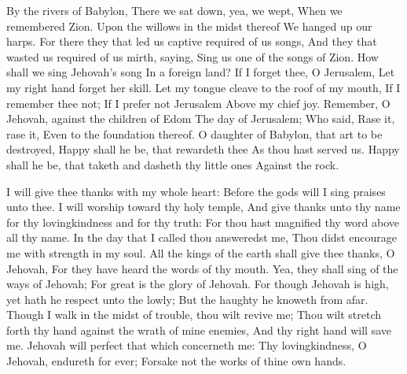 By the rivers of Babylon, There we sat down, yea, we wept, When we remembered Zion.  Upon the willows in the midst thereof We hanged up our harps.  For there they that led us captive required of us songs, And they that wasted us required of us mirth, saying, Sing us one of the songs of Zion.  How shall we sing Jehovah’s song In a foreign land?  If I forget thee, O Jerusalem, Let my right hand forget her skill.  Let my tongue cleave to the roof of my mouth, If I remember thee not; If I prefer not Jerusalem Above my chief joy.  Remember, O Jehovah, against the children of Edom The day of Jerusalem; Who said, Rase it, rase it, Even to the foundation thereof.  O daughter of Babylon, that art to be destroyed, Happy shall he be, that rewardeth thee As thou hast served us.  Happy shall he be, that taketh and dasheth thy little ones Against the rock. 

I will give thee thanks with my whole heart: Before the gods will I sing praises unto thee.  I will worship toward thy holy temple, And give thanks unto thy name for thy lovingkindness and for thy truth: For thou hast magnified thy word above all thy name.  In the day that I called thou answeredst me, Thou didst encourage me with strength in my soul.  All the kings of the earth shall give thee thanks, O Jehovah, For they have heard the words of thy mouth.  Yea, they shall sing of the ways of Jehovah; For great is the glory of Jehovah.  For though Jehovah is high, yet hath he respect unto the lowly; But the haughty he knoweth from afar.  Though I walk in the midst of trouble, thou wilt revive me; Thou wilt stretch forth thy hand against the wrath of mine enemies, And thy right hand will save me.  Jehovah will perfect that which concerneth me: Thy lovingkindness, O Jehovah, endureth for ever; Forsake not the works of thine own hands. 

